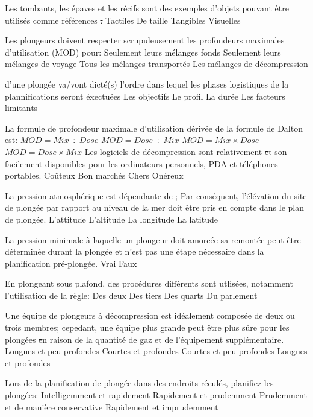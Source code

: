 \documentclass[english,10pt,twoside]{article}
\begin{document}
\begin{outline}
		\1 Les tombants, les épaves et les récifs sont des exemples d'objets pouvant être utilisés comme références \st.
			\2 Tactiles
			\2 De taille
			\2 Tangibles
			\2 Visuelles

		\1 Les plongeurs doivent respecter scrupuleusement les profondeurs maximales d'utilisation (MOD) pour:
			\2 Seulement leurs mélanges fonds
			\2 Seulement leurs mélanges de voyage
			\2 Tous les mélanges transportés
			\2 Les mélanges de décompression

		\1 \st d'une plongée va/vont dicté(s) l'ordre dans lequel les phases logistiques de la plannifications seront éxectuées
			\2 Les objectifs
			\2 Le profil
			\2 La durée
			\2 Les facteurs limitants

		\1 La formule de profondeur maximale d'utilisation dérivée de la formule de Dalton est:
			\2 $MOD = Mix \div Dose$
			\2 $MOD = Dose \div Mix$
			\2 $MOD = Mix \times Dose$
			\2 $MOD = Dose \times Mix$
		\1 Les logiciels de décompression sont relativement \st et son facilement disponibles pour les ordinateurs personnels, PDA et téléphones portables.
			\2 Coûteux
			\2 Bon marchés
			\2 Chers
			\2 Onéreux

		\1 La pression atmosphérique est dépendante de \st; Par conséquent, l'élévation du site de plongée par rapport au niveau de la mer doit être pris en compte dans le plan de plongée.
			\2 L'attitude
			\2 L'altitude
			\2 La longitude
			\2 La latitude

		\1 La pression minimale à laquelle un plongeur doit amorcée sa remontée peut être déterminée durant la plongée et n'est pas une étape nécessaire dans la planification pré-plongée.
			\2 Vrai
			\2 Faux

		\1 En plongeant sous plafond, des procédures différents sont utlisées, notamment l'utilisation de la règle:
			\2 Des deux
			\2 Des tiers
			\2 Des quarts
			\2 Du parlement

		\1 Une équipe de plongeurs à décompression est idéalement composée de deux ou trois membres; cepedant, une équipe plus grande peut être plus sûre pour les plongées \st en raison de la quantité de gaz et de l'équipement supplémentaire.
			\2 Longues et peu profondes
			\2 Courtes et profondes
			\2 Courtes et peu profondes
			\2 Longues et profondes

		\1 Lors de la planification de plongée dans des endroits réculés, planifiez les plongées:
			\2 Intelligemment et rapidement
			\2 Rapidement et prudemment
			\2 Prudemment et de manière conservative
			\2 Rapidement et imprudemment


\end{outline}
\end{document}
